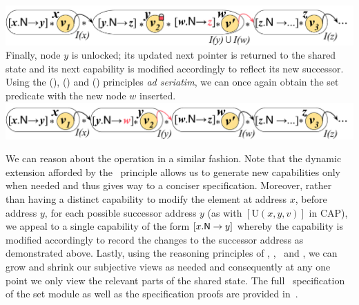 %
\includegraphics[scale=0.215]{Sections/FurtherExamples/Images/add2.pdf}\\
%
Finally, node $y$ is unlocked; its updated next pointer is returned to the shared state and its next capability is modified accordingly to reflect its new successor. Using the (\copyRule), (\forgetRule) and (\shiftRule) principles \textit{ad seriatim}, we can once again obtain the set predicate with the new node $w$ inserted. \\
%
\includegraphics[scale=0.215]{Sections/FurtherExamples/Images/add3.pdf}
%

We can reason about the  operation in a similar fashion. Note that the dynamic extension afforded by the \extendRule\ principle allows us to generate new capabilities only when needed and thus gives way to a conciser specification. 
%
Moreover, rather than having a distinct capability to modify the element at address $x$, before address $y$, for each possible successor address $y$ (as with $[\text{U}(x, y, v)]$ in CAP), we appeal to a single capability of the form $\nextC{x}{y}$ whereby the capability is modified accordingly to record the changes to the successor address as demonstrated above. 
%
Lastly, using the reasoning principles of \mergeRule, \forgetRule, \shiftRule\ and \copyRule, we can grow and shrink our subjective views as needed and consequently at any one point we only view the relevant parts of the shared state. 
%
The full \colosl\ specification of the set module as well as the specification proofs are provided in~\cite{colosl-tr14}.


